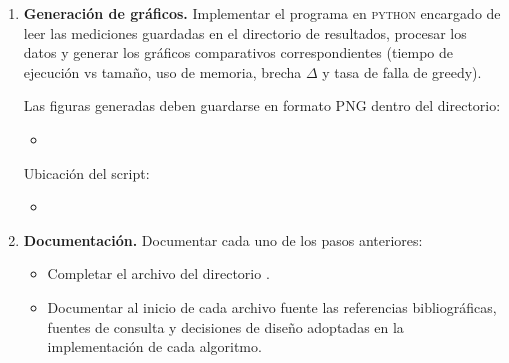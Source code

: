 \begin{enumerate}[(1)]
  Los resultados de las mediciones deben almacenarse en archivos de texto dentro del directorio:
  \begin{itemize}
    \item {}
  \end{itemize}
  
  Además del tiempo de ejecución y el consumo de memoria, para cada instancia se debe registrar el \textbf{puntaje} obtenido por cada algoritmo (o el indicador de falla), con el objetivo de evaluar la calidad de la solución greedy respecto al óptimo mediante:
  \begin{itemize}
    \item la \textbf{brecha} $\Delta = s(C^{*}) - s(C_{\text{greedy}}) \geq 0$, en los casos en que greedy encuentra un camino válido, y
    \item la \textbf{tasa de falla}, correspondiente a la proporción de casos en que greedy no logra alcanzar la meta.
  \end{itemize}
  Como los valores del terreno pueden ser negativos o cero, no se utiliza una razón porcentual como $s(C_{\text{greedy}}) / s(C^{*})$.

  Archivos a entregar:
  \begin{itemize}
    \item {}
    \item {}
  \end{itemize}
  Dado su costo factorial/exponencial, el algoritmo de \textsc{fuerza bruta} solo debe ejecutarse en instancias con $N + M \leq 32$.

  \item \textbf{Generación de gráficos.} Implementar el programa en \textsc{python} encargado de leer las mediciones guardadas en el directorio de resultados, procesar los datos y generar los gráficos comparativos correspondientes (tiempo de ejecución vs tamaño, uso de memoria, brecha $\Delta$ y tasa de falla de greedy).
  
  Las figuras generadas deben guardarse en formato PNG dentro del directorio:
  \begin{itemize}
    \item {}
  \end{itemize}

  Ubicación del script:
  \begin{itemize}
    \item {}
  \end{itemize}

  \item \textbf{Documentación.} Documentar cada uno de los pasos anteriores:
  \begin{itemize}
    \item Completar el archivo  del directorio .
    \item Documentar al inicio de cada archivo fuente las referencias bibliográficas, fuentes de consulta y decisiones de diseño adoptadas en la implementación de cada algoritmo.
  \end{itemize}
\end{enumerate}
